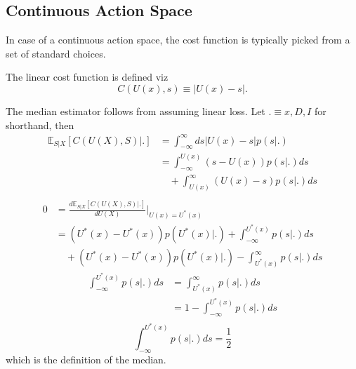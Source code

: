 	\subsection{Continuous Action Space}
	In case of a continuous action space, the cost function is typically picked from a set of standard choices.	
	\begin{definition}
		\label{def:linear_cost_function}
		The linear cost function is defined viz
		\begin{equation}
			C(U(x),s) \equiv |U(x)-s|.
		\end{equation}
		
	\end{definition}
	\begin{theorem}
		The median estimator follows from assuming linear loss. Let $.\equiv x,D,I$ for shorthand, then
		\begin{equation}
			\begin{split}
				\mathbb{E}_{S|X}[C(U(X), S)|.] &= \int_{-\infty}^{\infty} ds |U(x)-s| p(s|.)\\
				&= \int_{-\infty}^{U(x)} (s-U(x))p(s|.)ds\\
				&\quad+\int_{U(x)}^\infty (U(x)-s)p(s|.)ds\\
			\end{split}
		\end{equation}
		\begin{equation}
			\begin{split}
				0 &=\frac{d \mathbb{E}_{S|X}[C(U(X), S)|.]}{dU(X)}\bigg|_{U(x)=U^*(x)}\\
				&= (U^*(x)-U^*(x))p(U^*(x)|.)+\int_{-\infty}^{U^*(x)} p(s|.)ds\\
				&\quad+(U^*(x)-U^*(x))p(U^*(x)|.)-\int_{U^*(x)}^\infty p(s|.)ds
			\end{split}
		\end{equation}
		\begin{equation}
			\begin{split}
				\int_{-\infty}^{U^*(x)} p(s|.)ds &= \int_{U^*(x)}^\infty p(s|.)ds\\
				&= 1- \int_{-\infty}^{U^*(x)} p(s|.)ds\\
			\end{split}
		\end{equation}
		\begin{equation}
			\int_{-\infty}^{U^*(x)} p(s|.)ds = \frac{1}{2}
		\end{equation}
		which is the definition of the median.
	\end{theorem}
	
